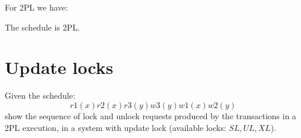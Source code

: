 \documentclass[12pt, a4paper]{report}
\newtheorem[style=M,bodystyle=\normalfont]{theorem}{Theorem}
\newtheorem[style=M,bodystyle=\normalfont]{corollary}{Corollary}
\newtheorem[style=M,bodystyle=\normalfont]{lemma}{Lemma}
\newtheorem[style=M,bodystyle=\normalfont]{definition}{Definition}
\begin{document}
        For 2PL we have:
        \begin{table}[H]
            \centering
        \end{table}
        The schedule is 2PL. 

    \newpage

    \section{Update locks}
        Given the schedule:
        \[r1(x) r2(x) r3(y) w3(y) w1(x) w2(y)\]
        show the sequence of lock and unlock requests produced by the transactions in a 2PL execution, in a system with update lock (available locks: $SL, UL, XL$).
\end{document}
